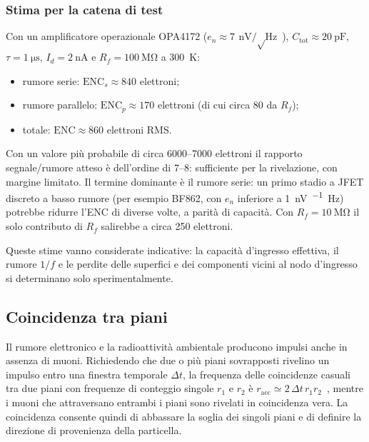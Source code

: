 \documentclass[11pt,a4paper]{article}
\begin{document}
\subsubsection{Stima per la catena di test}

Con un amplificatore operazionale OPA4172 ($e_n \approx \SI{7}{\nano\volt\per\sqrt\hertz}$~\cite{opa4172}), $C_{\mathrm{tot}} \approx \SI{20}{\pico\farad}$, $\tau = \SI{1}{\micro\second}$, $I_d = \SI{2}{\nano\ampere}$ e $R_f=\SI{100}{\mega\ohm}$ a \SI{300}{\kelvin}:
\begin{itemize}
  \item rumore serie: $\mathrm{ENC}_s \approx \num{840}$ elettroni;
  \item rumore parallelo: $\mathrm{ENC}_p \approx \num{170}$ elettroni (di cui circa \num{80} da $R_f$);
  \item totale: $\mathrm{ENC} \approx \num{860}$ elettroni RMS.
\end{itemize}
Con un valore più probabile di circa \num{6000}--\num{7000} elettroni il rapporto segnale/rumore atteso è dell'ordine di \num{7}--\num{8}: sufficiente per la rivelazione, con margine limitato. Il termine dominante è il rumore serie: un primo stadio a JFET discreto a basso rumore (per esempio BF862, con $e_n$ inferiore a \SI{1}{\nano\volt\per\sqrt\hertz}) potrebbe ridurre l'ENC di diverse volte, a parità di capacità. Con $R_f=\SI{10}{\mega\ohm}$ il solo contributo di $R_f$ salirebbe a circa \num{250} elettroni.

Queste stime vanno considerate indicative: la capacità d'ingresso effettiva, il rumore $1/f$ e le perdite delle superfici e dei componenti vicini al nodo d'ingresso si determinano solo sperimentalmente.

\subsection{Coincidenza tra piani}

Il rumore elettronico e la radioattività ambientale producono impulsi anche in assenza di muoni. Richiedendo che due o più piani sovrapposti rivelino un impulso entro una finestra temporale $\Delta t$, la frequenza delle coincidenze casuali tra due piani con frequenze di conteggio singole $r_1$ e $r_2$ è $r_{\mathrm{acc}} \simeq 2\,\Delta t\,r_1 r_2$~\cite{knoll2010}, mentre i muoni che attraversano entrambi i piani sono rivelati in coincidenza vera. La coincidenza consente quindi di abbassare la soglia dei singoli piani e di definire la direzione di provenienza della particella.
\end{document}
